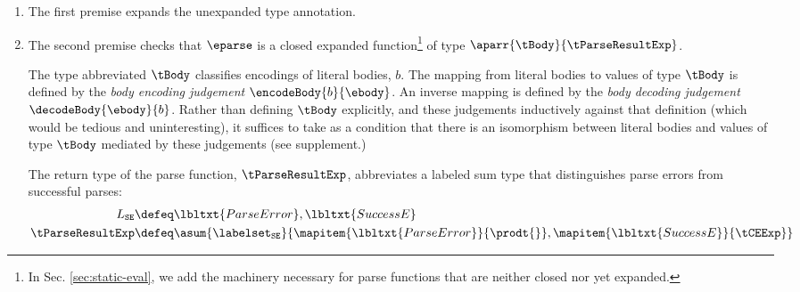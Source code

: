 \documentclass[acmsmall,10pt,review,anonymous]{acmart}\settopmatter{printfolios=true}
\begin{document}
\begin{enumerate}
\item The first premise expands the unexpanded type annotation.

\item The second premise checks that $\eparse$ is a closed expanded function\footnote{In Sec. \ref{sec:static-eval}, we add the machinery necessary for parse functions that are neither closed nor yet expanded.} of type $\aparr{\tBody}{\tParseResultExp}$. 

The type abbreviated $\tBody$ classifies encodings of literal bodies, $b$. The mapping from literal bodies to values of type $\tBody$ is defined by the \emph{body encoding judgement} $\encodeBody{b}{\ebody}$. An inverse mapping is defined   by the \emph{body decoding judgement} $\decodeBody{\ebody}{b}$. Rather than defining $\tBody$ explicitly, and these judgements inductively against that definition (which would be tedious and uninteresting), it suffices to take as a condition that there is an isomorphism between literal bodies and values of type $\tBody$ mediated by these judgements (see supplement.)

The return type of the parse function, $\tParseResultExp$, abbreviates a labeled sum type that distinguishes parse errors from successful parses:
\begin{align*}
L_\mathtt{SE} & \defeq \lbltxt{ParseError}, \lbltxt{SuccessE}\\
\tParseResultExp & \defeq \asum{\labelset_\mathtt{SE}}{
  \mapitem{\lbltxt{ParseError}}{\prodt{}}, 
  \mapitem{\lbltxt{SuccessE}}{\tCEExp}
}
\end{align*} %


\end{enumerate}
\end{document}
